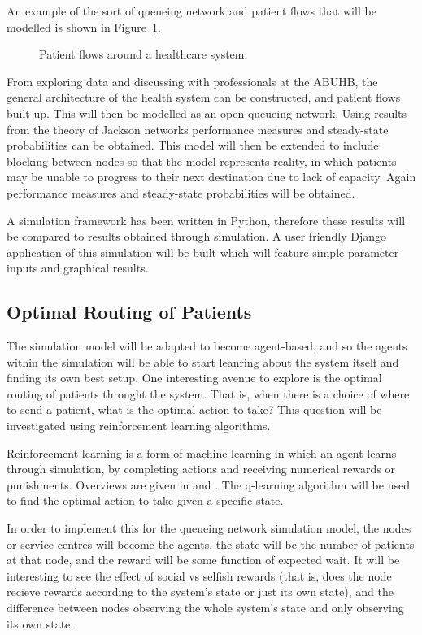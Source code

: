 \documentclass{article}
\begin{document}
An example of the sort of queueing network and patient flows that will be modelled is shown in Figure~\ref{fig:healthsystem}.

\begin{figure}[H]
    
    \caption{Patient flows around a healthcare system.}
    \label{fig:healthsystem}
\end{figure}

From exploring data and discussing with professionals at the ABUHB, the general architecture of the health system can be constructed, and patient flows built up.
This will then be modelled as an open queueing network.
Using results from the theory of Jackson networks performance measures and steady-state probabilities can be obtained.
This model will then be extended to include blocking between nodes so that the model represents reality, in which patients may be unable to progress to their next destination due to lack of capacity.
Again performance measures and steady-state probabilities will be obtained.

A simulation framework has been written in Python, therefore these results will be compared to results obtained through simulation.
A user friendly Django application of this simulation will be built which will feature simple parameter inputs and graphical results.

\subsection{Optimal Routing of Patients}
The simulation model will be adapted to become agent-based, and so the agents within the simulation will be able to start leanring about the system itself and finding its own best setup.
One interesting avenue to explore is the optimal routing of patients throught the system.
That is, when there is a choice of where to send a patient, what is the optimal action to take?
This question will be investigated using reinforcement learning algorithms.

Reinforcement learning is a form of machine learning in which an agent learns through simulation, by completing actions and receiving numerical rewards or punishments.
Overviews are given in \cite{suttonbarto98} and \cite{szepesvari10}.
The q-learning algorithm will be used to find the optimal action to take given a specific state.

In order to implement this for the queueing network simulation model, the nodes or service centres will become the agents, the state will be the number of patients at that node, and the reward will be some function of expected wait.
It will be interesting to see the effect of social vs selfish rewards (that is, does the node recieve rewards according to the system's state or just its own state), and the difference between nodes observing the whole system's state and only observing its own state.
\end{document}
